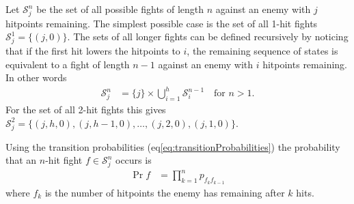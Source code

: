 Let $\mathcal{S}_j^n$ be the set of all possible fights of length $n$ against an enemy with $j$ hitpoints remaining. The simplest possible case is the set of all 1-hit fights $\mathcal{S}_j^1 = \{(j,0)\}$. The sets of all longer fights can be defined recursively by noticing that if the first hit lowers the hitpoints to $i$, the remaining sequence of states is equivalent to a fight of length $n-1$ against an enemy with $i$ hitpoints remaining. In other words
\begin{align}
	\mathcal{S}_j^n &=  \{j\} \times \bigcup_{i=1}^h \mathcal{S}_i^{n-1} \quad \mbox{for } n>1.\label{eq:fightRecursion}
\end{align}
For the set of all 2-hit fights this gives $\mathcal{S}_j^2 = \{(j,h,0), (j,h-1,0), \ldots, (j,2,0), (j,1,0)\}$.

Using the transition probabilities (eq\ref{eq:transitionProbabilities}) the probability that an $n$-hit fight $f \in \mathcal{S}_{j}^n$ occurs is
\begin{align}
    \Pr{f} &= \prod_{k=1}^{n} p_{f_{k} f_{k-1}}
\end{align}
where $f_k$ is the number of hitpoints the enemy has remaining after $k$ hits.

